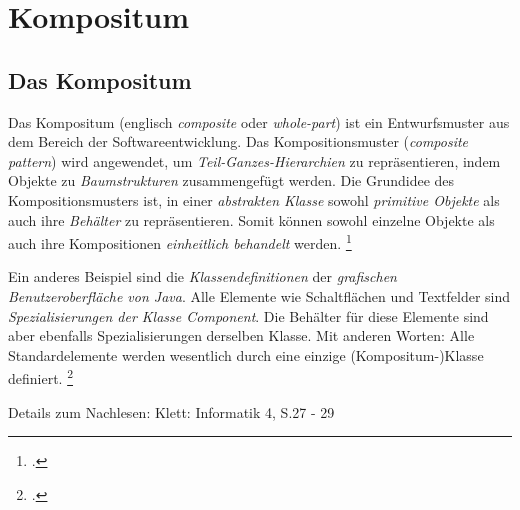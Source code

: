 \documentclass{bschlangaul-haupt}
\begin{document}

\chapter{Kompositum}

\begin{liQuellen}
\item \cite{wiki:kompositum}
\item \cite[Seite 139-147]{gof}
\item \cite[Seite 102-104]{eilebrecht}
\item \cite[Kapitel 14, Seite 173]{siebler}
\end{liQuellen}

\section{Das Kompositum}

Das Kompositum (englisch \emph{composite} oder \emph{whole-part}) ist
ein Entwurfsmuster aus dem Bereich der Softwareentwicklung. Das
Kompositionsmuster (\emph{composite pattern}) wird angewendet, um
\emph{Teil-Ganzes-Hierarchien} zu repräsentieren, indem Objekte zu
\emph{Baumstrukturen} zusammengefügt werden. Die Grundidee des
Kompositionsmusters ist, in einer \emph{abstrakten Klasse} sowohl
\emph{primitive Objekte} als auch ihre \emph{Behälter} zu
repräsentieren. Somit können sowohl einzelne Objekte als auch ihre
Kompositionen \emph{einheitlich behandelt} werden.
\footcite{aud:fs:4}

Ein anderes Beispiel sind die \emph{Klassendefinitionen} der
\emph{grafischen Benutzeroberfläche von Java}. Alle Elemente wie
Schaltflächen und Textfelder sind \emph{Spezialisierungen der Klasse
Component}. Die Behälter für diese Elemente sind aber ebenfalls
Spezialisierungen derselben Klasse. Mit anderen Worten: Alle
Standardelemente werden wesentlich durch eine einzige
(Kompositum-)Klasse definiert.
\footcite{wiki:kompositum}

\begin{center}
\liEntwurfsKompositumUml
\end{center}

Details zum Nachlesen: Klett: Informatik 4, S.27 - 29
\end{document}
